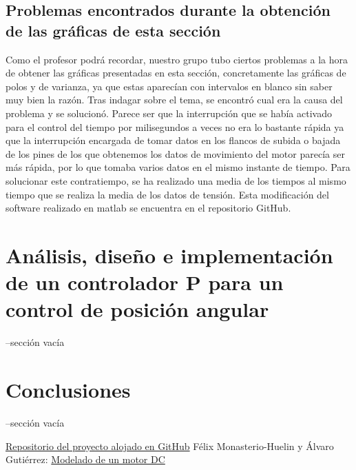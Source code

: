 \documentclass[a4paper]{article}
\begin{document}
\subsection{Problemas encontrados durante la obtención de las gráficas de esta sección}
Como el profesor podrá recordar, nuestro grupo tubo ciertos problemas a la hora de obtener las gráficas presentadas en esta sección, concretamente las gráficas de polos y de varianza,
ya que estas aparecían con intervalos en blanco sin saber muy bien la razón. Tras indagar sobre el tema, se encontró cual era la causa
del problema y se solucionó. Parece ser que la interrupción que se había activado para el control del tiempo por milisegundos a veces
no era lo bastante rápida ya que la interrupción encargada de tomar datos en los flancos de subida o bajada de los pines de los que obtenemos
los datos de movimiento del motor parecía ser más rápida, por lo que tomaba varios datos en el mismo instante de tiempo. Para solucionar este
contratiempo, se ha realizado una media de los tiempos al mismo tiempo que se realiza la media de los datos de tensión. Esta modificación del
software realizado en matlab se encuentra en el repositorio GitHub.


\section{Análisis, diseño e implementación de un controlador P para un control de posición angular}

--sección vacía

\section{Conclusiones}

--sección vacía



\begin{thebibliography}{99}
 \href{https://github.com/jjalberca/reallabo2018}{Repositorio del proyecto alojado en GitHub}
 Félix Monasterio-Huelin y Álvaro Gutiérrez: \href{http://robolabo.etsit.upm.es/asignaturas/seco/apuntes/modelado.pdf}{Modelado de un motor DC}
\end{thebibliography}
\end{document}
